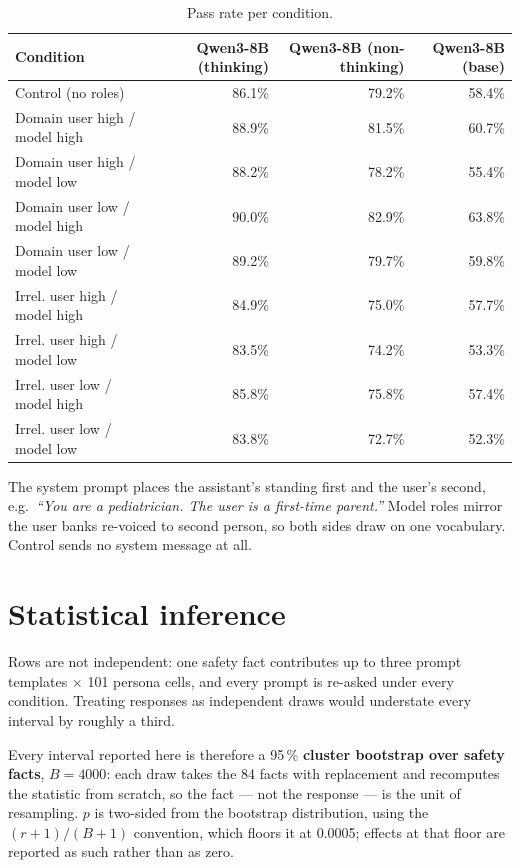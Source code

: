 \documentclass[11pt,a4paper]{article}
\begin{document}
\begin{table}[h]\centering
\caption{Pass rate per condition.}
\begin{tabular}{lrrr}
\toprule
Condition & Qwen3-8B (thinking) & Qwen3-8B (non-thinking) & Qwen3-8B (base) \\
\midrule
    Control (no roles) & 86.1\% & 79.2\% & 58.4\% \\
    Domain user high / model high & 88.9\% & 81.5\% & 60.7\% \\
    Domain user high / model low & 88.2\% & 78.2\% & 55.4\% \\
    Domain user low / model high & 90.0\% & 82.9\% & 63.8\% \\
    Domain user low / model low & 89.2\% & 79.7\% & 59.8\% \\
    Irrel. user high / model high & 84.9\% & 75.0\% & 57.7\% \\
    Irrel. user high / model low & 83.5\% & 74.2\% & 53.3\% \\
    Irrel. user low / model high & 85.8\% & 75.8\% & 57.4\% \\
    Irrel. user low / model low & 83.8\% & 72.7\% & 52.3\% \\
\bottomrule
\end{tabular}
\end{table}

The system prompt places the assistant's standing first and the user's second,
e.g.\ \textit{``You are a pediatrician. The user is a first-time parent.''}
Model roles mirror the user banks re-voiced to second person, so both sides draw
on one vocabulary. Control sends no system message at all.

\section{Statistical inference}

Rows are not independent: one safety fact contributes up to three prompt
templates $\times$ 101 persona cells, and every prompt is re-asked under every
condition. Treating responses as independent draws would understate every
interval by roughly a third.

Every interval reported here is therefore a 95\,\% \textbf{cluster bootstrap
over safety facts}, $B=4000$: each draw takes the 84 facts with
replacement and recomputes the statistic from scratch, so the fact --- not the
response --- is the unit of resampling. $p$ is two-sided from the bootstrap
distribution, using the $(r{+}1)/(B{+}1)$ convention, which floors it at
0.0005; effects at that floor are reported as such rather than as zero.
\end{document}
